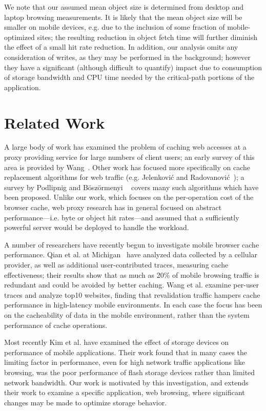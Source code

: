 \documentclass[letterpaper,twocolumn,10pt]{article}
\begin{document}
We note that our assumed mean object size is determined from desktop
and laptop browsing measurements. It is likely that the mean object size will be
smaller on mobile devices, e.g. due to the inclusion of some fraction
of mobile-optimized sites; the resulting reduction in object fetch time will
further diminish the effect of a small hit rate reduction.
In addition, our analysis omits any consideration of writes, as they may
be performed in the background; however they have a significant (although
difficult to quantify) impact due to consumption of storage bandwidth and CPU
time needed by the critical-path portions of the application.

\section{Related Work}
A large body of work has examined the problem of caching web accesses at a proxy
providing service for large numbers of client users; an early survey of this
area is provided by Wang~\cite{wang_survey_1999}. Other work has focused more
specifically on cache replacement algorithms for web traffic
(e.g. Jelenkovi\'{c} and Radovanovi\'{c}~\cite{Jelenkovic_optimizing_2004}); a
survey by Podlipnig and B\"{o}sz\"{o}rmenyi ~\cite{podlipnig_survey_2003} covers
many such algorithms which have been proposed. Unlike our work, which focuses on
the per-operation cost of the browser cache, web proxy research has in general
focused on abstract performance---i.e. byte or object hit rates---and assumed
that a sufficiently powerful server would be deployed to handle the workload.

A number of researchers have recently begun to investigate mobile browser cache
performance. Qian et al. at Michigan~\cite{qian_web_2012} have analyzed data
collected by a cellular provider, as well as additional user-contributed traces,
measuring cache effectiveness; their results show that as much as 20\% of mobile
browsing traffic is redundant and could be avoided by better caching. Wang et
al. \cite{wang_how_2011} examine per-user traces and analyze top10 websites,
finding that revalidation traffic hampers cache performance in high-latency
mobile environments. In each case the focus has been on the cacheability of data
in the mobile environment, rather than the system performance of cache
operations.

Most recently Kim et al. \cite{kim12} have examined the effect of storage
devices on performance of mobile applications. Their work found that in many
cases the limiting factor in performance, even for high network traffic
applications like browsing, was the poor performance of flash storage devices
rather than limited network bandwidth. Our work is motivated by this
investigation, and extends their work to examine a specific application, web
browsing, where significant changes may be made to optimize storage behavior.
\end{document}
